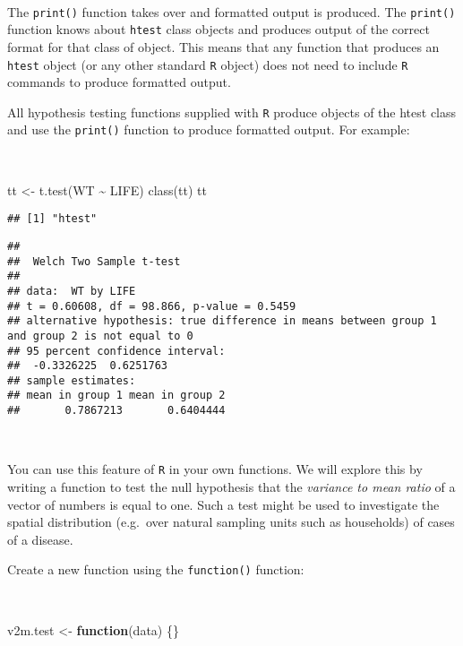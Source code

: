 \documentclass[
  12pt,
  a4paper]{book}
\newenvironment{Shaded}{\begin{snugshade}}{\end{snugshade}}
\newcommand{\ControlFlowTok}[1]{\textcolor[rgb]{0.13,0.29,0.53}{\textbf{#1}}}
\newcommand{\FunctionTok}[1]{\textcolor[rgb]{0.00,0.00,0.00}{#1}}
\newcommand{\NormalTok}[1]{#1}
\newcommand{\OtherTok}[1]{\textcolor[rgb]{0.56,0.35,0.01}{#1}}
\newcommand{\SpecialCharTok}[1]{\textcolor[rgb]{0.00,0.00,0.00}{#1}}
\begin{document}
~

The \texttt{print()} function takes over and formatted output is produced. The \texttt{print()} function knows about \texttt{htest} class objects and produces output of the correct format for that class of object. This means that any function that produces an \texttt{htest} object (or any other standard \texttt{R} object) does not need to include \texttt{R} commands to produce formatted output.

All hypothesis testing functions supplied with \texttt{R} produce objects of the htest class and use the \texttt{print()} function to produce formatted output. For example:

~

\begin{Shaded}
\begin{Highlighting}[]
\NormalTok{tt }\OtherTok{\textless{}{-}} \FunctionTok{t.test}\NormalTok{(WT }\SpecialCharTok{\textasciitilde{}}\NormalTok{ LIFE)}
\FunctionTok{class}\NormalTok{(tt)}
\NormalTok{tt}
\end{Highlighting}
\end{Shaded}

\begin{verbatim}
## [1] "htest"
\end{verbatim}

\begin{verbatim}
## 
##  Welch Two Sample t-test
## 
## data:  WT by LIFE
## t = 0.60608, df = 98.866, p-value = 0.5459
## alternative hypothesis: true difference in means between group 1 and group 2 is not equal to 0
## 95 percent confidence interval:
##  -0.3326225  0.6251763
## sample estimates:
## mean in group 1 mean in group 2 
##       0.7867213       0.6404444
\end{verbatim}

~

You can use this feature of \texttt{R} in your own functions. We will explore this by writing a function to test the null hypothesis that the \emph{variance to mean ratio} of a vector of numbers is equal to one. Such a test might be used to investigate the spatial distribution (e.g.~over natural sampling units such as households) of cases of a disease.

Create a new function using the \texttt{function()} function:

~

\begin{Shaded}
\begin{Highlighting}[]
\NormalTok{v2m.test }\OtherTok{\textless{}{-}} \ControlFlowTok{function}\NormalTok{(data) \{\}}
\end{Highlighting}
\end{Shaded}
\end{document}
